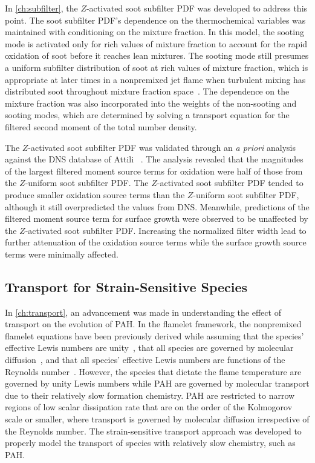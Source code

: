 In \cref{ch:subfilter}, the $Z$-activated soot subfilter PDF was developed to address this point. The soot subfilter PDF's dependence on the thermochemical variables was maintained with conditioning on the mixture fraction. In this model, the sooting mode is activated only for rich values of mixture fraction to account for the rapid oxidation of soot before it reaches lean mixtures. The sooting mode still presumes a uniform subfilter distribution of soot at rich values of mixture fraction, which is appropriate at later times in a nonpremixed jet flame when turbulent mixing has distributed soot throughout mixture fraction space~\cite{attili2014}. The dependence on the mixture fraction was also incorporated into the weights of the non-sooting and sooting modes, which are determined by solving a transport equation for the filtered second moment of the total number density.

The $Z$-activated soot subfilter PDF was validated through an \textit{a priori} analysis against the DNS database of Attili \etal~\cite{attili2014}. The analysis revealed that the magnitudes of the largest filtered moment source terms for oxidation were half of those from the $Z$-uniform soot subfilter PDF. The $Z$-activated soot subfilter PDF tended to produce smaller oxidation source terms than the $Z$-uniform soot subfilter PDF, although it still overpredicted the values from DNS. Meanwhile, predictions of the filtered moment source term for surface growth were observed to be unaffected by the $Z$-activated soot subfilter PDF. Increasing the normalized filter width lead to further attenuation of the oxidation source terms while the surface growth source terms were minimally affected.

\subsection{Transport for Strain-Sensitive Species}
\label{sec:conclusion:contributions:transport}

In \cref{ch:transport}, an advancement was made in understanding the effect of transport on the evolution of PAH. In the flamelet framework, the nonpremixed flamelet equations have been previously derived while assuming that the species' effective Lewis numbers are unity~\cite{peters1984}, that all species are governed by molecular diffusion~\cite{pitsch1998}, and that all species' effective Lewis numbers are functions of the Reynolds number~\cite{wang2016}. However, the species that dictate the flame temperature are governed by unity Lewis numbers while PAH are governed by molecular transport due to their relatively slow formation chemistry. PAH are restricted to narrow regions of low scalar dissipation rate that are on the order of the Kolmogorov scale or smaller, where transport is governed by molecular diffusion irrespective of the Reynolds number. The strain-sensitive transport approach was developed to properly model the transport of species with relatively slow chemistry, such as PAH.

